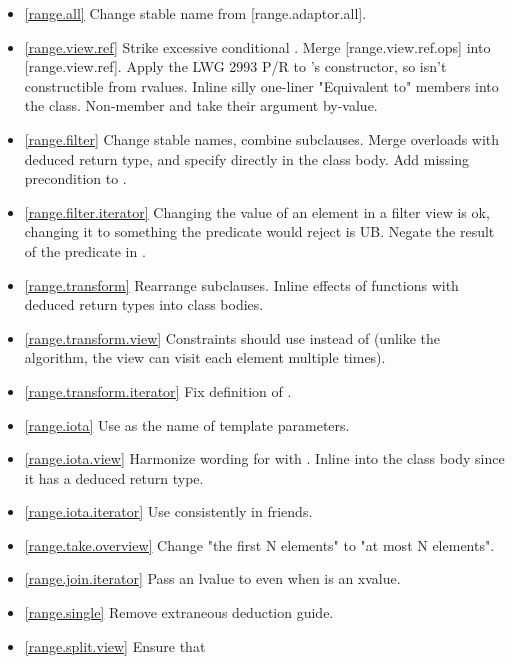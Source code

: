 \begin{itemize}
  [range.adaptor.semiregular_wrapper]; editorial rephrasing.
\item \ref{range.all} Change stable name from [range.adaptor.all].
\item \ref{range.view.ref} Strike excessive conditional .
  Merge [range.view.ref.ops] into [range.view.ref].
  Apply the LWG 2993 P/R to 's constructor, so
   isn't constructible from rvalues.
  Inline silly one-liner "\effects Equivalent to" members into the class.
  Non-member  and  take their argument by-value.
\item \ref{range.filter} Change stable names, combine subclauses.
  Merge  overloads with deduced return type,
  and specify directly in the class body.
  Add missing precondition to .
\item \ref{range.filter.iterator}
  Changing the value of an element in a filter view is ok, changing it to
  something the predicate would reject is UB.
  Negate the result of the predicate in .
\item \ref{range.transform} Rearrange subclauses. Inline effects of functions
  with deduced return types into class bodies.
\item \ref{range.transform.view}
  Constraints should use  instead of 
  (unlike the algorithm, the view can visit each element multiple times).
\item \ref{range.transform.iterator} Fix definition of .
\item \ref{range.iota} Use  as the name of 
  template parameters.
\item \ref{range.iota.view} Harmonize wording for
   with .
  Inline  into the class body since it has a deduced return type.
\item \ref{range.iota.iterator} Use  consistently in friends.
\item \ref{range.take.overview} Change "the first N elements" to
  "at most N elements".
\item \ref{range.join.iterator} Pass an lvalue to
   even when  is an xvalue.
\item \ref{range.single} Remove extraneous 
  deduction guide.
\item \ref{range.split.view} Ensure that 

\end{itemize}
